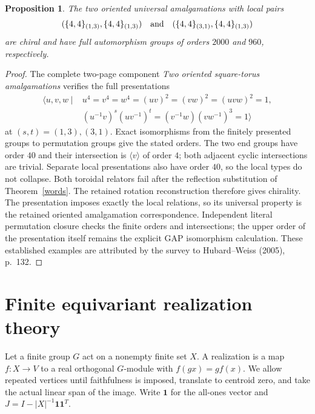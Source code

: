 \documentclass[11pt,a4paper]{article}
\newtheorem{proposition}[theorem]{Proposition}
\newcommand{\gen}[1]{\langle #1\rangle}
\begin{document}
\begin{proposition}\label{oriented}
The two oriented universal amalgamations with local pairs
\[
 (\{4,4\}_{(1,3)},\{4,4\}_{(1,3)})\quad\hbox{and}\quad
 (\{4,4\}_{(3,1)},\{4,4\}_{(1,3)})
\]
are chiral and have full automorphism groups of orders $2000$
and $960$, respectively.
\end{proposition}
\begin{proof}
The complete two-page component \emph{Two oriented square-torus
amalgamations} verifies the full presentations
\begin{align*}
 \gen{u,v,w\mid{}&u^4=v^4=w^4=(uv)^2=(vw)^2=(uvw)^2=1,\\
 &(u^{-1}v)^s(uv^{-1})^t=(v^{-1}w)(vw^{-1})^3=1}
\end{align*}
at $(s,t)=(1,3),(3,1)$. Exact isomorphisms from the finitely
presented groups to permutation groups give the stated orders.
The two end groups have order $40$ and their intersection is
$\gen v$ of order $4$; both adjacent cyclic intersections
are trivial. Separate local presentations also have order $40$,
so the local types do not collapse. Both toroidal relators
fail after the reflection substitution of Theorem~\ref{words}.
The retained rotation reconstruction therefore gives chirality.
The presentation imposes exactly the local relations, so its
universal property is the retained oriented amalgamation
correspondence. Independent literal permutation closure checks
the finite orders and intersections; the upper order of the
presentation itself remains the explicit GAP isomorphism
calculation. These established examples are attributed by
the survey to Hubard--Weiss (2005), p.~132.
\end{proof}

\section{Finite equivariant realization theory}

Let a finite group $G$ act on a nonempty finite set $X$. A realization is
a map $f:X\to V$ to a real orthogonal $G$-module with
$f(gx)=gf(x)$. We allow repeated vertices until faithfulness
is imposed, translate to centroid zero, and take the actual
linear span of the image. Write $\mathbf1$ for the all-ones
vector and $J=I-|X|^{-1}\mathbf1\mathbf1^T$.
\end{document}
